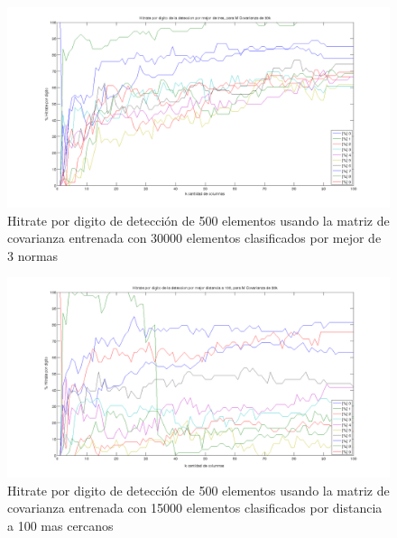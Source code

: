 \begin{figure}[H]
\begin {center}
\includegraphics[width=500pt]{plots/pordig-30kcv-bo3.png}
\end {center}
\caption{Hitrate por digito de detecci\'on de 500 elementos usando la matriz de covarianza entrenada con 30000 elementos
clasificados por mejor de 3 normas}
\label{fig:HRD30kcv-bo3}
\end{figure}

\begin{figure}[H]
\begin {center}
\includegraphics[width=500pt]{plots/pordig-30kcv-100mejores.png}
\end {center}
\caption{Hitrate por digito de detecci\'on de 500 elementos usando la matriz de covarianza entrenada con 15000 elementos
clasificados por distancia a 100 mas cercanos}
\label{fig:HRD30kcv-dist100}
\end{figure}